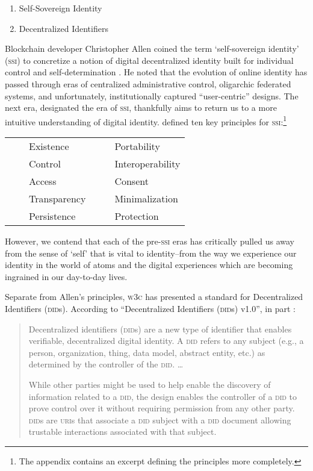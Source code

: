 \documentclass[twoside]{article}
\newcommand{\tabitem}{~~\llap{\textbullet}~~}
\begin{document}
\begin{enumerate}
  \item Self-Sovereign Identity
  \item Decentralized Identifiers
\end{enumerate}

\noindent \sloppy
Blockchain developer Christopher Allen coined the term `self-sovereign identity' (\textsc{ssi}) to concretize a notion of digital decentralized identity built for individual control and self-determination \citep{Allen2016}. He noted that the evolution of online identity has passed through eras of centralized administrative control, oligarchic federated systems, and unfortunately, institutionally captured ``user-centric'' designs. The next era, designated the era of \textsc{ssi}, thankfully aims to return us to a more intuitive understanding of digital identity. \citeauthor{Allen2016} defined ten key principles for \textsc{ssi}:\footnote{The appendix contains an excerpt defining the principles more completely.}

\begin{tabular}{ll}
  \tabitem  Existence
  &
  \tabitem  Portability \\
  \tabitem  Control
  &
  \tabitem  Interoperability \\
  \tabitem  Access
  &
  \tabitem  Consent \\
  \tabitem  Transparency
  &
  \tabitem  Minimalization \\
  \tabitem  Persistence
  &
  \tabitem  Protection \\
\end{tabular}

However, we contend that each of the pre-\textsc{ssi} eras has critically pulled us away from the sense of `self' that is vital to identity–from the way we experience our identity in the world of atoms and the digital experiences which are becoming ingrained in our day-to-day lives.

Separate from Allen's principles, \textsc{w3c} has presented a standard for Decentralized Identifiers (\textsc{did}s). According to ``Decentralized Identifiers (\textsc{did}s) v1.0'', in part \citep{W3C2022}:

\begin{quote}
Decentralized identifiers (\textsc{did}s) are a new type of identifier that enables verifiable, decentralized digital identity. A \textsc{did} refers to any subject (e.g., a person, organization, thing, data model, abstract entity, etc.) as determined by the controller of the \textsc{did}.  \ldots{}

While other parties might be used to help enable the discovery of information related to a \textsc{did}, the design enables the controller of a \textsc{did} to prove control over it without requiring permission from any other party. \textsc{did}s are \textsc{uri}s that associate a \textsc{did} subject with a \textsc{did} document allowing trustable interactions associated with that subject.
\end{quote}
\end{document}
